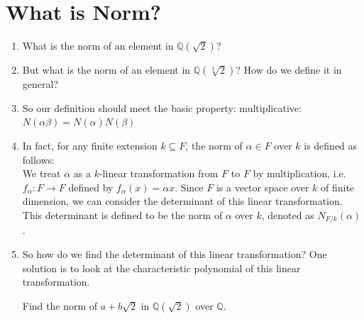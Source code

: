 \documentclass[15pt]{scrartcl}
\newcommand{\Q}{\mathbb{Q}}
\begin{document}
\section{What is Norm?}
\begin{enumerate}
    \item What is the norm of an element in $\Q(\sqrt{2})$?  
    \item But what is the norm of an element in $\Q(\sqrt[3]{2})$? How do we define it in general?
    \item So our definition should meet the basic property: multiplicative: $N(\alpha\beta) = N(\alpha)N(\beta)$
    \item In fact, for any finite extension $k\subseteq F$, the norm of $\alpha \in F$ over $k$ is defined as follows:
    \\
    We treat $\alpha$ as a $k$-linear transformation from $F$ to $F$ by multiplication, i.e. $f_\alpha: F \to F$ defined by $f_\alpha(x) = \alpha x$. Since $F$ is a vector space over $k$ of finite dimension, we can consider the determinant of this linear transformation. This determinant is defined to be the norm of $\alpha$ over $k$, denoted as $N_{F/k}(\alpha)$.
    \item So how do we find the determinant of this linear transformation? One solution is to look at the characteristic polynomial of this linear transformation. 
    \begin{example}
    Find the norm of $a+b\sqrt{2}$ in $\Q(\sqrt{2})$ over $\Q$.
    \\


\end{example}
\end{enumerate}
\end{document}

